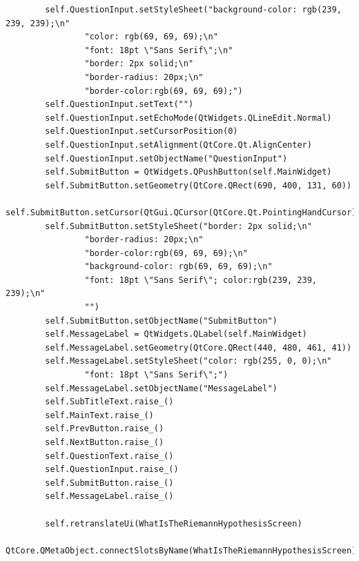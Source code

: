 \documentclass[12pt]{article}
\begin{document}
\begin{lstlisting}
        self.QuestionInput.setStyleSheet("background-color: rgb(239, 239, 239);\n"
                "color: rgb(69, 69, 69);\n"
                "font: 18pt \"Sans Serif\";\n"
                "border: 2px solid;\n"
                "border-radius: 20px;\n"
                "border-color:rgb(69, 69, 69);")
        self.QuestionInput.setText("")
        self.QuestionInput.setEchoMode(QtWidgets.QLineEdit.Normal)
        self.QuestionInput.setCursorPosition(0)
        self.QuestionInput.setAlignment(QtCore.Qt.AlignCenter)
        self.QuestionInput.setObjectName("QuestionInput")
        self.SubmitButton = QtWidgets.QPushButton(self.MainWidget)
        self.SubmitButton.setGeometry(QtCore.QRect(690, 400, 131, 60))
        self.SubmitButton.setCursor(QtGui.QCursor(QtCore.Qt.PointingHandCursor))
        self.SubmitButton.setStyleSheet("border: 2px solid;\n"
                "border-radius: 20px;\n"
                "border-color:rgb(69, 69, 69);\n"
                "background-color: rgb(69, 69, 69);\n"
                "font: 18pt \"Sans Serif\"; color:rgb(239, 239, 239);\n"
                "")
        self.SubmitButton.setObjectName("SubmitButton")
        self.MessageLabel = QtWidgets.QLabel(self.MainWidget)
        self.MessageLabel.setGeometry(QtCore.QRect(440, 480, 461, 41))
        self.MessageLabel.setStyleSheet("color: rgb(255, 0, 0);\n"
                "font: 18pt \"Sans Serif\";")
        self.MessageLabel.setObjectName("MessageLabel")
        self.SubTitleText.raise_()
        self.MainText.raise_()
        self.PrevButton.raise_()
        self.NextButton.raise_()
        self.QuestionText.raise_()
        self.QuestionInput.raise_()
        self.SubmitButton.raise_()
        self.MessageLabel.raise_()

        self.retranslateUi(WhatIsTheRiemannHypothesisScreen)
        QtCore.QMetaObject.connectSlotsByName(WhatIsTheRiemannHypothesisScreen)


\end{lstlisting}
\end{document}
